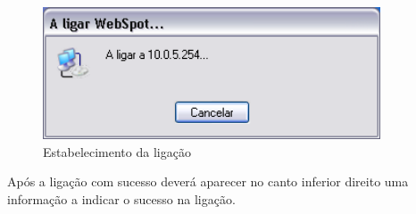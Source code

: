 \begin{figure}[H]
    \begin{center}
        \includegraphics[width=10cm]{include/img/xp_f9}
    \end{center}
    \caption{Estabelecimento da ligação}
    \label{fig:XPF9}
\end{figure}

Após a ligação com sucesso deverá aparecer no canto inferior direito uma informação a indicar o sucesso na ligação.
